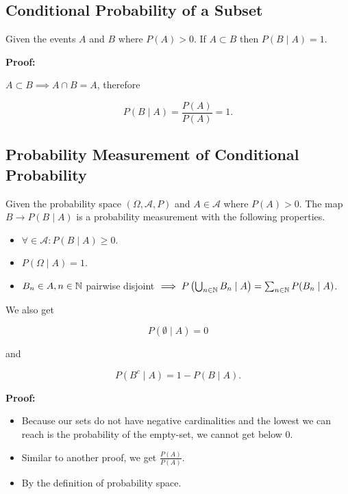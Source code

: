 \QED 

\subsection{Conditional Probability of a Subset} 

Given the events \(A\) and \(B\) where \(P(A) > 0\). If \(A \subset B\) then 
\(P(B \mid A) = 1\).

\textbf{Proof:}

\(A \subset B \implies A \cap B = A \), therefore 

\[
    P(B \mid A) = \frac{P(A)}{P(A)} = 1.
\]

\QED 

\subsection{Probability Measurement of Conditional Probability}

Given the probability space \((\Omega, \mathcal{A}, P)\) and \(A \in \mathcal{A}\) where 
\(P(A) > 0\). The map \(B \to P(B \mid A)\) is a probability measurement with 
the following properties.

\begin{itemize}
    
    \item \(\forall \in \mathcal{A}: P(B \mid A) \ge 0\).
    
    \item \(P(\Omega \mid A) = 1\).

    \item \(B_n \in A, n \in \mathbb{N}\) pairwise disjoint \(\implies P\left(\bigcup_{n \in \mathbb{N}} B _n \mid A\right) 
	    = \sum_{n \in \mathbb{N}} P(B_n \mid A)\).

\end{itemize}

We also get 

\[
    P(\emptyset \mid A) = 0 
\]

and 

\[
    P(B^c \mid A) = 1 - P(B \mid A).
\]

\textbf{Proof:}

\begin{itemize}

    \item Because our sets do not have negative cardinalities and the lowest we can reach is the probability of the empty-set, we cannot get below 0.

    \item Similar to another proof, we get \(\frac{P(A)}{P(A)}\). 

    \item By the definition of probability space.
	
\end{itemize}

